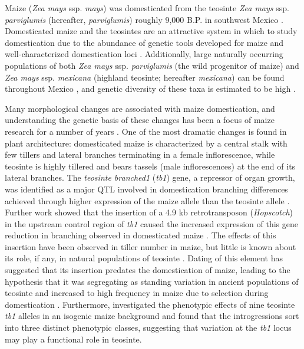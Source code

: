 \documentclass[11pt]{article}
\begin{document}
\begin{linenumbers}
\begin{flushleft}
Maize (\emph{Zea mays} ssp. \emph{mays}) was domesticated from the teosinte \emph{Zea mays} ssp. \emph{parviglumis} (hereafter, \emph{parviglumis}) roughly 9,000 B.P. in southwest Mexico \citep{Piperno2009, Matsuoka2002}. Domesticated maize and the teosintes are an attractive system in which to study domestication due to the abundance of genetic tools developed for maize and well-characterized domestication loci \citep{Hufford2012a, Doebley2004, Hufford2012b}. Additionally, large naturally occurring populations of both \emph{Zea mays} ssp. \emph{parviglumis} (the wild progenitor of maize) and \emph{Zea mays} ssp. \emph{mexicana} (highland teosinte; hereafter \emph{mexicana}) can be found throughout Mexico \citep{Wilkes1977, Hufford2013}, and genetic diversity of these taxa is estimated to be high \citep{Ross-Ibarra2009}.

Many morphological changes are associated with maize domestication, and understanding the genetic basis of these changes has been a focus of maize research for a number of years \citep{Doebley2004}. One of the most dramatic changes is found in plant architecture: domesticated maize is characterized by a central stalk with few tillers and lateral branches terminating in a female inflorescence, while teosinte is highly tillered and bears tassels (male inflorescences) at the end of its lateral branches. The \emph{teosinte branched1} (\emph{tb1}) gene, a repressor of organ growth, was identified as a major QTL involved in domestication branching differences achieved through higher expression of the maize allele than the teosinte allele \citep{DoebleyStecGustus1995, Doebley1997}. Further work showed that the insertion of a 4.9 kb retrotransposon (\emph{Hopscotch}) in the upstream control region of \emph{tb1} caused the increased expression of this gene reduction in branching observed in domesticated maize \cite{Studer2011}. The effects of this insertion have been observed in tiller number in maize, but little is known about its role, if any, in natural populations of teosinte \citep{Studer2011}. Dating of this element has suggested that its insertion predates the domestication of maize, leading to the hypothesis that it was segregating as standing variation in ancient populations of teosinte and increased to high frequency in maize due to selection during domestication \citep{Studer2011}. Furthermore, \citet{StuderDoebley2012} investigated the phenotypic effects of nine teosinte \emph{tb1} alleles in an isogenic maize background and found that the introgressions sort into three distinct phenotypic classes, suggesting that variation at the \emph{tb1} locus may play a functional role in teosinte.


\end{flushleft}
\end{linenumbers}
\end{document}

